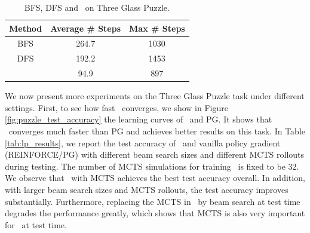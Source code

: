 \begin{table}[t]
{%
		}
	\end{table}
	
		\begin{table}[t]
		\centering
		{%
			\caption{BFS, DFS and \modelname~on Three Glass Puzzle.}
			\label{tab:graph_traversal_results}
			\begin{tabular}{|c|c|c|}
				\hline
				{Method} & {Average \# Steps} & {Max \# Steps} \\
				\hline
				BFS & 264.7 & 1030 \\
				DFS & 192.2 & 1453 \\
				\modelname~& 94.9 & 897 \\
				\hline
			\end{tabular}
		}
	\end{table}
	
We now present more experiments on the Three Glass Puzzle task under different settings. First, to see how fast \modelname~converges, we show in Figure \ref{fig:puzzle_test_accuracy} the learning curves of \modelname~and PG. It shows that \modelname~converges much faster than PG and achieves better results on this task. In Table \ref{tab:lp_results}, we report the test accuracy of \modelname~and vanilla policy gradient (REINFORCE/PG) with different beam search sizes and different MCTS rollouts during testing. The number of MCTS simulations for training \modelname~is fixed to be $32$. 
We observe that \modelname~with MCTS achieves the best test accuracy overall. In addition, with larger beam search sizes and MCTS rollouts, the test accuracy improves substantially. Furthermore, replacing the MCTS in \modelname~by beam search at test time degrades the performance greatly, which shows that MCTS is also very important for \modelname~at test time. 


